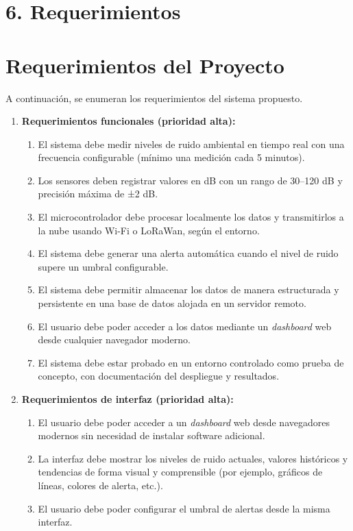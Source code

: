 \documentclass[
11pt, %
]{charter}
\begin{document}
\section{6. Requerimientos}
\label{sec:requerimientos}

\section{Requerimientos del Proyecto}

A continuación, se enumeran los requerimientos del sistema propuesto.

\begin{enumerate}
    \item \textbf{Requerimientos funcionales (prioridad alta):}
    \begin{enumerate}
        \item El sistema debe medir niveles de ruido ambiental en tiempo real con una frecuencia configurable (mínimo una medición cada 5 minutos).
        \item Los sensores deben registrar valores en dB con un rango de 30–120 dB y precisión máxima de ±2 dB.
        \item El microcontrolador debe procesar localmente los datos y transmitirlos a la nube usando Wi-Fi o LoRaWan, según el entorno.
        \item El sistema debe generar una alerta automática cuando el nivel de ruido supere un umbral configurable.
        \item El sistema debe permitir almacenar los datos de manera estructurada y persistente en una base de datos alojada en un servidor remoto.
        \item El usuario debe poder acceder a los datos mediante un \textit{dashboard} web desde cualquier navegador moderno.
        \item El sistema debe estar probado en un entorno controlado como prueba de concepto, con documentación del despliegue y resultados.
    \end{enumerate}

    \item \textbf{Requerimientos de interfaz (prioridad alta):}
    \begin{enumerate}
        \item El usuario debe poder acceder a un \textit{dashboard} web desde navegadores modernos sin necesidad de instalar software adicional.
        \item La interfaz debe mostrar los niveles de ruido actuales, valores históricos y tendencias de forma visual y comprensible (por ejemplo, gráficos de líneas, colores de alerta, etc.).
        \item El usuario debe poder configurar el umbral de alertas desde la misma interfaz.
    \end{enumerate}


\end{enumerate}
\end{document}
